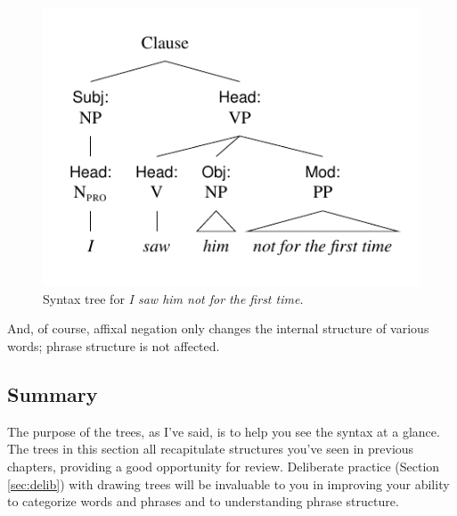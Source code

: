 \begin{figure}
    \centering
    \includegraphics{figures/notforthefirsttime.pdf}
    \caption{Syntax tree for \textit{I saw him not for the first time.}}
    \label{tree:notforthefirsttime}
\end{figure}

And, of course, affixal negation only changes the internal structure of various words; phrase structure is not affected.

\subsection{Summary}

The purpose of the trees, as I've said, is to help you see the syntax at a glance. The trees in this section all recapitulate structures you've seen in previous chapters, providing a good opportunity for review. Deliberate practice (Section \ref{sec:delib}) with drawing trees will be invaluable to you in improving your ability to categorize words and phrases and to understanding phrase structure.

